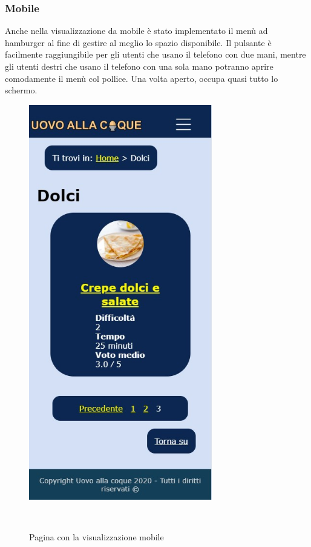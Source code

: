 \subsubsection{Mobile}
\label{ssub:mobile}
Anche nella visualizzazione da mobile è stato implementato il menù ad hamburger al fine di gestire al meglio lo spazio disponibile. Il pulsante è facilmente raggiungibile per gli utenti che usano il telefono con due mani, mentre gli utenti destri che usano il telefono con una sola mano potranno aprire comodamente il menù col pollice. Una volta aperto, occupa quasi tutto lo schermo.
\begin{figure}[H]
	\begin{minipage}[b]{8.5cm}
		\centering
		\includegraphics[width=8cm]{img/progettazione/mobile.jpg}
		\caption{Pagina con la visualizzazione mobile}
	\end{minipage}
	\ \hspace{2mm} \hspace{3mm} \
	\begin{minipage}[b]{8.5cm}

\end{minipage}
\end{figure}
